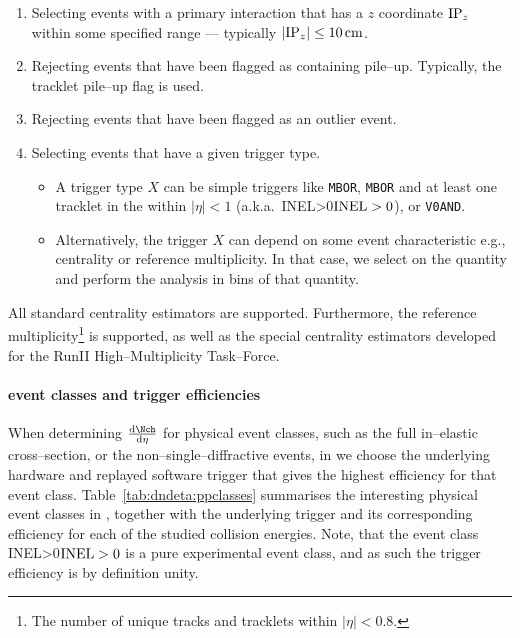 \documentclass[compat,11pt]{alicenote}
\DeclareRobustCommand{\AlwaysText}[1]{\ifmmode\relax\text{#1}\else #1\fi}
\newcommand*\INEL{\AlwaysText{INEL}}
\newcommand*\INELGT{\ifmmode\INEL>0\else$\INEL>0$\fi}
\newcommand{\tabref}[1]{Table~\ref{#1}}
\begin{document}
\begin{enumerate}
\item Selecting events with a primary interaction that has a $z$
  coordinate $\IPz$ within some specified range --- typically
  $|\IPz|\le\unit[10]{cm}$. 
\item Rejecting events that have been flagged as containing pile--up.
  Typically, the \SPD{} tracklet pile--up flag is used. 
\item Rejecting events that have been flagged as an \SPD{} outlier
  event. 
\item Selecting events that have a given trigger type.
  \begin{itemize}
  \item A trigger type $X$ can be simple triggers like \texttt{MBOR},
    \texttt{MBOR} and at least one tracklet in the \SPD{} within
    $|\eta|<1$ (a.k.a.~\INELGT{}), or \texttt{V0AND}. 
  \item Alternatively, the trigger $X$ can depend on some event
    characteristic e.g., centrality or reference multiplicity. In that
    case, we select on the quantity and perform the analysis in bins
    of that quantity.
  \end{itemize}
\end{enumerate}

All standard centrality estimators are supported.  Furthermore, the
reference multiplicity\footnote{The number of unique tracks and
  tracklets within $|\eta|<0.8$.} is supported, as well as the special
\ppCol{} centrality estimators developed for the RunII
High--Multiplicity Task--Force.

\paragraph{\ppCol{} event classes and trigger efficiencies} 

When determining $\dndeta$ for physical event classes, such as
the full in--elastic cross--section, or the non--single--diffractive
events, in \ppCol{} we choose the underlying hardware and replayed
software trigger that gives the highest efficiency for that event
class.  \tabref{tab:dndeta:ppclasses} summarises the interesting
physical event classes in \ppCol{}, together with the underlying
trigger and its corresponding efficiency for each of the studied
collision energies.  Note, that the event class \INELGT{} is a pure
experimental event class, and as such the trigger efficiency is by
definition unity. 
\end{document}
